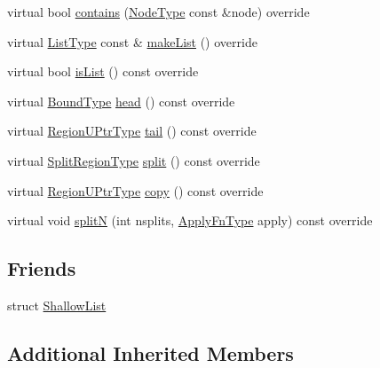 \begin{DoxyCompactItemize}
\item 
virtual bool \hyperlink{structvt_1_1group_1_1region_1_1_list_ac85ec02f77a44a2dadc1b51231e113a7}{contains} (\hyperlink{namespacevt_a866da9d0efc19c0a1ce79e9e492f47e2}{Node\+Type} const \&node) override
\item 
virtual \hyperlink{structvt_1_1group_1_1region_1_1_region_a4e35b2fc6dca06aca0b7bc0e19b35c5a}{List\+Type} const  \& \hyperlink{structvt_1_1group_1_1region_1_1_list_ade171ca43a1bef2feef9952625fba71a}{make\+List} () override
\item 
virtual bool \hyperlink{structvt_1_1group_1_1region_1_1_list_abdde7f8c33453db1938e9a27b3f18bd9}{is\+List} () const override
\item 
virtual \hyperlink{structvt_1_1group_1_1region_1_1_region_abf426ff85bed72c1c6524fad6a9f1751}{Bound\+Type} \hyperlink{structvt_1_1group_1_1region_1_1_list_a99c726e227dbac4f8efaa45a37033238}{head} () const override
\item 
virtual \hyperlink{structvt_1_1group_1_1region_1_1_region_ae5f42cf159116a3cf8bd65423eb01037}{Region\+U\+Ptr\+Type} \hyperlink{structvt_1_1group_1_1region_1_1_list_aaa38a1cc3062ed93fd6d6fbe2c65f1cf}{tail} () const override
\item 
virtual \hyperlink{structvt_1_1group_1_1region_1_1_region_ab8d05c0978c7f38292a9ed5a15498a4b}{Split\+Region\+Type} \hyperlink{structvt_1_1group_1_1region_1_1_list_a0f8352e79bb541ad17ea80843a363304}{split} () const override
\item 
virtual \hyperlink{structvt_1_1group_1_1region_1_1_region_ae5f42cf159116a3cf8bd65423eb01037}{Region\+U\+Ptr\+Type} \hyperlink{structvt_1_1group_1_1region_1_1_list_ac5885572f4cd651003cd6012ba247cda}{copy} () const override
\item 
virtual void \hyperlink{structvt_1_1group_1_1region_1_1_list_ad1950419288564d76527c24bd6d4f3a3}{splitN} (int nsplits, \hyperlink{structvt_1_1group_1_1region_1_1_region_a7c9e99b1157d2fe2f3e6fc36a1463a96}{Apply\+Fn\+Type} apply) const override
\end{DoxyCompactItemize}
\subsection*{Friends}
\begin{DoxyCompactItemize}
\item 
struct \hyperlink{structvt_1_1group_1_1region_1_1_list_a69d0f04a06a9f069becd00a6c894dbe9}{Shallow\+List}
\end{DoxyCompactItemize}
\subsection*{Additional Inherited Members}


